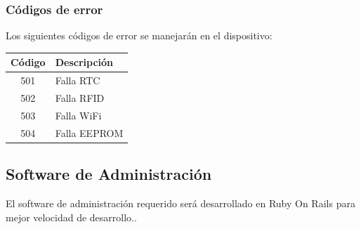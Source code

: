 \subsubsection{Códigos de error}
Los siguientes códigos de error se manejarán en el dispositivo:\label{sec:errores}\\
\begin{center}
	\begin{tabular}{|c|l|}
		\hline
		Código & Descripción \\
		\hline
		501 & Falla RTC\\
		502 & Falla RFID\\
		503 & Falla WiFi\\
		504 & Falla EEPROM\\
		\hline
	\end{tabular}
\end{center}
\subsection{Software de Administración}

El software de administraci\'on requerido ser\'a desarrollado en Ruby On Rails para mejor velocidad de desarrollo..

